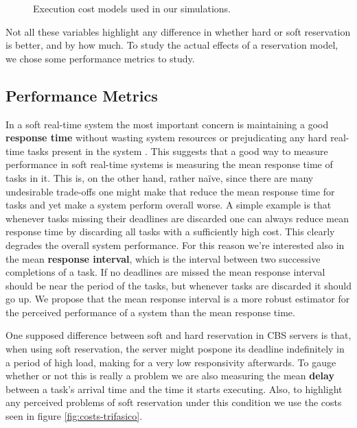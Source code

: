 \documentclass[times, 10pt,twocolumn]{article}
\begin{document}
\begin{figure*}[t]
  \centering
  \caption{Execution cost models used in our simulations.}
\end{figure*}

Not all these variables highlight any difference in whether hard or
soft reservation is better, and by how much. To study the actual
effects of a reservation model, we chose some performance metrics to study.

\subsection{Performance Metrics}
\label{sec:metrics}

In a soft real-time system the most important concern is maintaining a
good \textbf{response time} without wasting system resources or
prejudicating any hard real-time tasks present in the system
\cite{buttazzo05:soft}. This suggests that a good way to measure
performance in soft real-time systems is measuring the mean response
time of tasks in it. This is, on the other hand, rather naïve, since
there are many undesirable trade-offs one might make that reduce the
mean response time for tasks and yet make a system perform overall
worse. A simple example is that whenever tasks missing their deadlines
are discarded one can always reduce mean response time by discarding
all tasks with a sufficiently high cost. This clearly degrades the
overall system performance. For this reason we're interested also in
the mean \textbf{response interval}, which is the interval between two
successive completions of a task. If no deadlines are missed the mean
response interval should be near the period of the tasks, but whenever
tasks are discarded it should go up. We propose that the mean response
interval is a more robust estimator for the perceived performance of a
system than the mean response time.

One supposed difference between soft and hard reservation in CBS
servers is that, when using soft reservation, the server might pospone
its deadline indefinitely in a period of high load, making for a very
low responsivity afterwards. To gauge whether or not this is really a
problem we are also measuring the mean \textbf{delay} between a task's
arrival time and the time it starts executing. Also, to highlight any
perceived problems of soft reservation under this condition we use the
costs seen in figure \ref{fig:costs-trifasico}.
\end{document}
